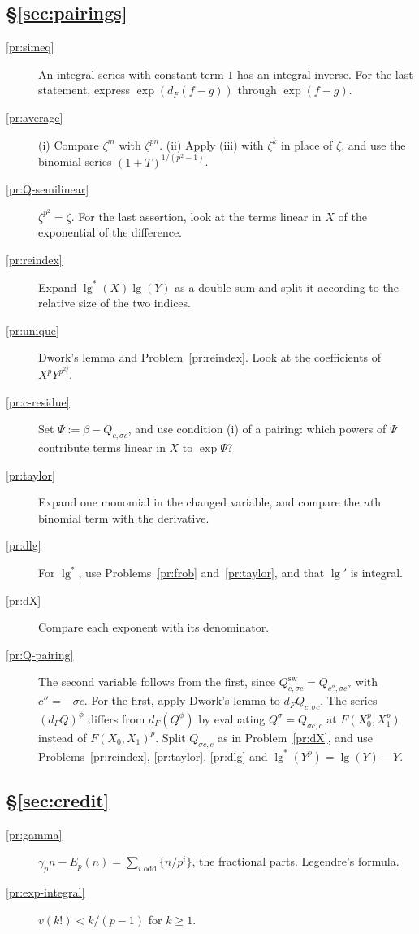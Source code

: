 \documentclass[reqno]{amsart}
\theoremstyle{definition}
\theoremstyle{plain}
\newcommand{\lgg}{\operatorname{lg}}
\newcommand{\sw}{\mathrm{sw}}
\begin{document}
\subsection*{\S\ref{sec:pairings}}
\begin{description}
\item[\ref{pr:simeq}] An integral series with constant term \(1\) has an integral inverse.  For the last statement, express \(\exp(d_F(f - g))\) through \(\exp(f - g)\).
\item[\ref{pr:average}] (i) Compare \(\zeta^m\) with \(\zeta^{pn}\).  (ii) Apply (iii) with \(\zeta^k\) in place of \(\zeta\), and use the binomial series \((1+T)^{1/(p^2-1)}\).
\item[\ref{pr:Q-semilinear}] \(\zeta^{p^2} = \zeta\).  For the last assertion, look at the terms linear in \(X\) of the exponential of the difference.
\item[\ref{pr:reindex}] Expand \(\lgg^*(X)\lgg(Y)\) as a double sum and split it according to the relative size of the two indices.
\item[\ref{pr:unique}] Dwork's lemma and Problem~\ref{pr:reindex}.  Look at the coefficients of \(X^p Y^{p^{2j}}\).
\item[\ref{pr:c-residue}] Set \(\Psi := \beta - Q_{c,\sigma c}\), and use condition (i) of a pairing: which powers of \(\Psi\) contribute terms linear in \(X\) to \(\exp\Psi\)?
\item[\ref{pr:taylor}] Expand one monomial in the changed variable, and compare the \(n\)th binomial term with the derivative.
\item[\ref{pr:dlg}] For \(\lgg^*\), use Problems~\ref{pr:frob} and~\ref{pr:taylor}, and that \(\lgg'\) is integral.
\item[\ref{pr:dX}] Compare each exponent with its denominator.
\item[\ref{pr:Q-pairing}] The second variable follows from the first, since \(Q_{c,\sigma c}^\sw = Q_{c'',\sigma c''}\) with \(c'' = -\sigma c\).  For the first, apply Dwork's lemma to \(d_F Q_{c,\sigma c}\).  The series \((d_FQ)^\phi\) differs from \(d_F(Q^\phi)\) by evaluating \(Q^\sigma = Q_{\sigma c, c}\) at \(F(X_0^p, X_1^p)\) instead of \(F(X_0,X_1)^p\).  Split \(Q_{\sigma c,c}\) as in Problem~\ref{pr:dX}, and use Problems~\ref{pr:reindex}, \ref{pr:taylor}, \ref{pr:dlg} and \(\lgg^*(Y^p) = \lgg(Y) - Y\).
\end{description}

\subsection*{\S\ref{sec:credit}}
\begin{description}
\item[\ref{pr:gamma}] \(\gamma_p n - E_p(n) = \sum_{i \text{ odd}} \{n/p^i\}\), the fractional parts.  Legendre's formula.
\item[\ref{pr:exp-integral}] \(v(k!) < k/(p-1)\) for \(k \ge 1\).
\end{description}
\end{document}

